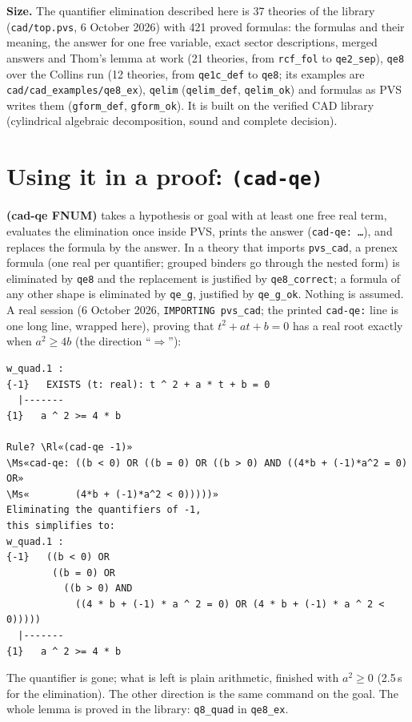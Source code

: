 \documentclass[11pt]{article}
\newcommand\Rl[1]{\textcolor{accent}{\textbf{#1}}}
\newcommand\Ms[1]{\textcolor{moss}{\textbf{#1}}}
\newcommand\cmdtag[1]{\colorbox{accentsoft}{\textcolor{accent}{\ttfamily\bfseries #1}}}
\begin{document}
\textbf{Size.} The quantifier elimination described here is 37 theories of the library (\texttt{cad/top.pvs},
6 October 2026) with 421 proved formulas: the formulas and their meaning, the answer for one free variable, exact
sector descriptions, merged answers and Thom's lemma at work (21 theories, from \texttt{rcf\_fol} to
\texttt{qe2\_sep}), \texttt{qe8} over the Collins run (12 theories, from \texttt{qe1c\_def} to \texttt{qe8}; its
examples are \texttt{cad/cad\_examples/qe8\_ex}),
\texttt{qelim} (\texttt{qelim\_def}, \texttt{qelim\_ok}) and formulas as PVS writes them (\texttt{gform\_def},
\texttt{gform\_ok}).
It is built on the verified CAD library (cylindrical algebraic decomposition, sound and complete decision).

\section{Using it in a proof: \texttt{(cad-qe)}}

\cmdtag{(cad-qe FNUM)} takes a hypothesis or goal with at least one free real term, evaluates the elimination once
inside PVS, prints the answer (\texttt{cad-qe: \dots}), and replaces the formula by the answer. In a theory that
imports \texttt{pvs\_cad}, a prenex formula (one real per quantifier; grouped binders go through the nested form)
is eliminated by \texttt{qe8} and the replacement is justified by \texttt{qe8\_correct}; a formula of any other
shape is eliminated by \texttt{qe\_g}, justified by \texttt{qe\_g\_ok}.
Nothing is assumed. A real session (6 October 2026, \texttt{IMPORTING pvs\_cad}; the printed \texttt{cad-qe:} line is
one long line, wrapped here), proving that $t^2+at+b=0$ has a
real root exactly when $a^2\ge 4b$ (the direction ``$\Rightarrow$''):

\begin{termbox}
\begin{Verbatim}[commandchars=\\«»]
w_quad.1 :
{-1}   EXISTS (t: real): t ^ 2 + a * t + b = 0
  |-------
{1}   a ^ 2 >= 4 * b

Rule? \Rl«(cad-qe -1)»
\Ms«cad-qe: ((b < 0) OR ((b = 0) OR ((b > 0) AND ((4*b + (-1)*a^2 = 0) OR»
\Ms«        (4*b + (-1)*a^2 < 0)))))»
Eliminating the quantifiers of -1,
this simplifies to:
w_quad.1 :
{-1}   ((b < 0) OR
        ((b = 0) OR
          ((b > 0) AND
            ((4 * b + (-1) * a ^ 2 = 0) OR (4 * b + (-1) * a ^ 2 < 0)))))
  |-------
{1}   a ^ 2 >= 4 * b
\end{Verbatim}
\end{termbox}
The quantifier is gone; what is left is plain arithmetic, finished with $a^2\ge0$ (2.5\,s for the
elimination). The other direction is the same command on the goal. The whole lemma is proved in the library:
\texttt{q8\_quad} in \texttt{qe8\_ex}.
\end{document}
